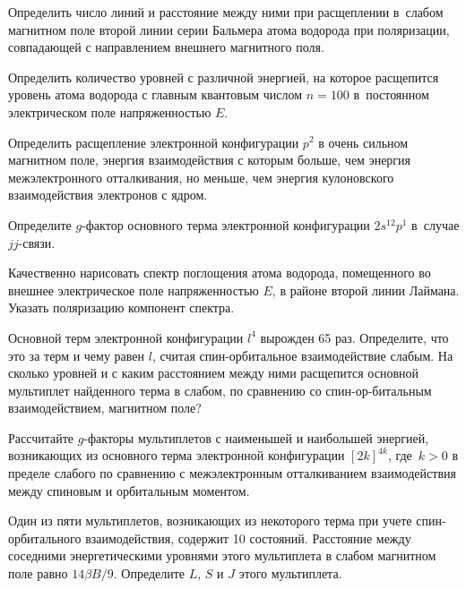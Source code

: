 \par
{} Определить число линий и расстояние между ними при расщеплении в~слабом магнитном поле второй линии серии Бальмера атома водорода при поляризации, совпадающей с направлением внешнего магнитного поля.
\par
{} Определить количество уровней с различной энергией, на которое расщепится уровень атома водорода с главным квантовым числом $n = 100$ в~постоянном электрическом поле напряженностью $E$.
\par
{} Определить расщепление электронной конфигурации $p^2$ в очень сильном магнитном поле, энергия взаимодействия с которым больше, чем энергия межэлектронного отталкивания, но меньше, чем энергия кулоновского взаимодействия электронов с ядром.
\par
{} Определите $g$-фактор основного терма электронной конфигурации $2s^12p^1$ в~случае $jj$-связи.
\par
{} Качественно нарисовать спектр поглощения атома водорода, помещенного во внешнее электрическое поле напряженностью $E$, в районе второй линии Лаймана. Указать поляризацию компонент спектра.
\par
{} Основной терм электронной конфигурации $l^4$ вырожден 65 раз. Определите, что это за терм и чему равен $l$, считая спин-орбитальное взаимодействие слабым. На сколько уровней и с каким расстоянием между ними расщепится основной мультиплет найденного терма в слабом, по сравнению со спин-ор-битальным взаимодействием, магнитном поле?
\par
{} Рассчитайте $g$-факторы мультиплетов с наименьшей и наибольшей энергией, возникающих из основного терма электронной конфигурации $[2k]^{4k}$, где~${k>0}$ в пределе слабого по сравнению с межэлектронным отталкиванием взаимодействия между спиновым и орбитальным моментом.
\par
{} Один из пяти мультиплетов, возникающих из некоторого терма при учете спин-орбитального взаимодействия, содержит 10 состояний. Расстояние между соседними энергетическими уровнями этого мультиплета в слабом магнитном поле равно $14\beta B/9$. Определите $L$, $S$ и $J$ этого мультиплета.
\par

